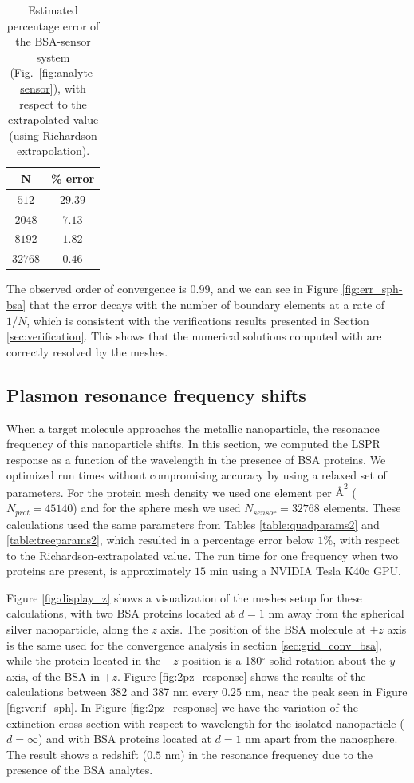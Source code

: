  \begin{table}%
    \centering
    \caption{\label{table:err_sph-bsa} Estimated percentage error of the BSA-sensor 
    system (Fig.~\ref{fig:analyte-sensor}), with respect to the extrapolated value 
    (using Richardson extrapolation).} 
    \begin{tabular}{c c}
    \hline%
    N & \% error \\
    \hline%
     $512$ & $29.39$ \\
     $2048$ & $7.13$ \\
     $8192$ & $1.82$ \\
     $32768$ & $0.46$ \\
    \hline%
    \end{tabular}
\end{table}

The observed order of convergence is 0.99, and we can see in Figure
\ref{fig:err_sph-bsa} that the error decays with the number of boundary elements
at a rate of $1/N$, which is consistent with the verifications results presented
in Section \ref{sec:verification}. This shows that the numerical solutions computed
with \pygbe are correctly resolved by the meshes.

\subsection{Plasmon resonance frequency shifts} \label{sec:shift_bsa}

When a target molecule approaches the metallic nanoparticle, the resonance frequency
of this nanoparticle shifts. In this section, we computed the LSPR response as a
function of the wavelength in the presence of BSA proteins. We optimized run times 
without compromising accuracy by using a relaxed set of parameters. For the protein
mesh density we used one element per $\text{\AA}^2$ ($N_{prot} = 45140$) and for the
sphere mesh we used $N_{sensor} = 32768$ elements. These calculations used the same
parameters from Tables \ref{table:quadparams2} and \ref{table:treeparams2}, which 
resulted in a percentage error below $1\%$, with respect to the Richardson-extrapolated
value. The run time for one frequency when two proteins are present, is approximately 
$15$ min using a NVIDIA Tesla K40c GPU.

Figure \ref{fig:display_z} shows a visualization of the meshes setup for these 
calculations, with two BSA proteins located at $d=1$ nm away from the spherical 
silver nanoparticle, along the $z$ axis. The position of the BSA molecule at $+z$ 
axis is the same used for the convergence analysis in section \ref{sec:grid_conv_bsa},
while the protein located in the $-z$ position is a 180$^\circ$ solid rotation 
about the $y$ axis, of the BSA in $+z$.  Figure \ref{fig:2pz_response} shows the results
of the calculations between 382 and 387 nm every $0.25$ nm, near the peak seen in Figure
\ref{fig:verif_sph}. In Figure \ref{fig:2pz_response} we have the variation of the 
extinction cross section with respect to wavelength for the isolated nanoparticle 
($d=\infty$) and with BSA proteins located at $d=1$ nm apart from the nanosphere. The
result shows a redshift ($0.5$ nm) in the resonance frequency due to the presence of 
the BSA analytes.

